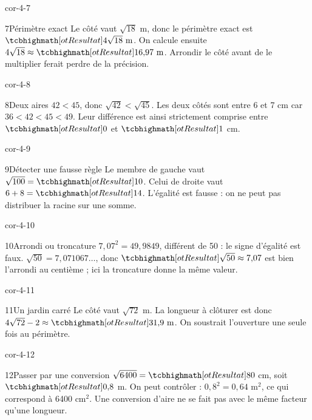 \begin{blocLivre}{cor-4-7}\begin{corrige}{7}{Périmètre exact}
Le côté vaut $\sqrt{18}$ m, donc le périmètre exact est $\res{4\sqrt{18}\ \mathrm m}$. On calcule ensuite $4\sqrt{18}\approx\res{16{,}97\ \mathrm m}$. Arrondir le côté avant de le multiplier ferait perdre de la précision.
\label{fig-cor-4-7}
\end{corrige}\end{blocLivre}
\begin{blocLivre}{cor-4-8}\begin{corrige}{8}{Deux aires}
$42<45$, donc $\sqrt{42}<\sqrt{45}$. Les deux côtés sont entre 6 et 7 cm car $36<42<45<49$. Leur différence est ainsi strictement comprise entre $\res0$ et $\res1$ cm.
\end{corrige}\end{blocLivre}
\begin{blocLivre}{cor-4-9}\begin{corrige}{9}{Détecter une fausse règle}
Le membre de gauche vaut $\sqrt{100}=\res{10}$. Celui de droite vaut $6+8=\res{14}$. L’égalité est fausse : on ne peut pas distribuer la racine sur une somme.
\end{corrige}\end{blocLivre}
\begin{blocLivre}{cor-4-10}\begin{corrige}{10}{Arrondi ou troncature}
$7{,}07^2=49{,}9849$, différent de 50 : le signe d’égalité est faux. $\sqrt{50}=7{,}071067\ldots$, donc $\res{\sqrt{50}\approx7{,}07}$ est bien l’arrondi au centième ; ici la troncature donne la même valeur.
\end{corrige}\end{blocLivre}
\begin{blocLivre}{cor-4-11}\begin{corrige}{11}{Un jardin carré}
Le côté vaut $\sqrt{72}$ m. La longueur à clôturer est donc $4\sqrt{72}-2\approx\res{31{,}9\ \mathrm m}$. On soustrait l’ouverture une seule fois au périmètre.
\label{fig-cor-4-11}
\end{corrige}\end{blocLivre}
\begin{blocLivre}{cor-4-12}\begin{corrige}{12}{Passer par une conversion}
$\sqrt{6400}=\res{80}$ cm, soit $\res{0{,}8}$ m. On peut contrôler : $0{,}8^2=0{,}64$ m$^2$, ce qui correspond à 6400 cm$^2$. Une conversion d’aire ne se fait pas avec le même facteur qu’une longueur.
\end{corrige}\end{blocLivre}
